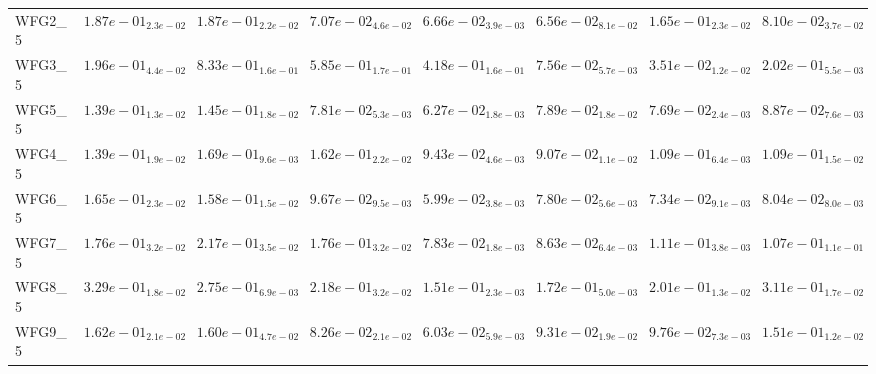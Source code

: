 \documentclass{article}
\begin{document}
\begin{table}
\begin{scriptsize}
\begin{tabular}{llllllll}
WFG2\_5 & $  1.87e-01_{ 2.3e-02}$ & $  1.87e-01_{ 2.2e-02}$ & $  7.07e-02_{ 4.6e-02}$ & \cellcolor{gray25}$  6.66e-02_{ 3.9e-03}$ & \cellcolor{gray95}$  6.56e-02_{ 8.1e-02}$ & $  1.65e-01_{ 2.3e-02}$ & $  8.10e-02_{ 3.7e-02}$ \\
WFG3\_5 & $  1.96e-01_{ 4.4e-02}$ & $  8.33e-01_{ 1.6e-01}$ & $  5.85e-01_{ 1.7e-01}$ & $  4.18e-01_{ 1.6e-01}$ & \cellcolor{gray25}$  7.56e-02_{ 5.7e-03}$ & \cellcolor{gray95}$  3.51e-02_{ 1.2e-02}$ & $  2.02e-01_{ 5.5e-03}$ \\
WFG5\_5 & $  1.39e-01_{ 1.3e-02}$ & $  1.45e-01_{ 1.8e-02}$ & $  7.81e-02_{ 5.3e-03}$ & \cellcolor{gray95}$  6.27e-02_{ 1.8e-03}$ & $  7.89e-02_{ 1.8e-02}$ & \cellcolor{gray25}$  7.69e-02_{ 2.4e-03}$ & $  8.87e-02_{ 7.6e-03}$ \\
WFG4\_5 & $  1.39e-01_{ 1.9e-02}$ & $  1.69e-01_{ 9.6e-03}$ & $  1.62e-01_{ 2.2e-02}$ & \cellcolor{gray25}$  9.43e-02_{ 4.6e-03}$ & \cellcolor{gray95}$  9.07e-02_{ 1.1e-02}$ & $  1.09e-01_{ 6.4e-03}$ & $  1.09e-01_{ 1.5e-02}$ \\
WFG6\_5 & $  1.65e-01_{ 2.3e-02}$ & $  1.58e-01_{ 1.5e-02}$ & $  9.67e-02_{ 9.5e-03}$ & \cellcolor{gray95}$  5.99e-02_{ 3.8e-03}$ & $  7.80e-02_{ 5.6e-03}$ & \cellcolor{gray25}$  7.34e-02_{ 9.1e-03}$ & $  8.04e-02_{ 8.0e-03}$ \\
WFG7\_5 & $  1.76e-01_{ 3.2e-02}$ & $  2.17e-01_{ 3.5e-02}$ & $  1.76e-01_{ 3.2e-02}$ & \cellcolor{gray95}$  7.83e-02_{ 1.8e-03}$ & \cellcolor{gray25}$  8.63e-02_{ 6.4e-03}$ & $  1.11e-01_{ 3.8e-03}$ & $  1.07e-01_{ 1.1e-01}$ \\
WFG8\_5 & $  3.29e-01_{ 1.8e-02}$ & $  2.75e-01_{ 6.9e-03}$ & $  2.18e-01_{ 3.2e-02}$ & \cellcolor{gray95}$  1.51e-01_{ 2.3e-03}$ & \cellcolor{gray25}$  1.72e-01_{ 5.0e-03}$ & $  2.01e-01_{ 1.3e-02}$ & $  3.11e-01_{ 1.7e-02}$ \\
WFG9\_5 & $  1.62e-01_{ 2.1e-02}$ & $  1.60e-01_{ 4.7e-02}$ & \cellcolor{gray25}$  8.26e-02_{ 2.1e-02}$ & \cellcolor{gray95}$  6.03e-02_{ 5.9e-03}$ & $  9.31e-02_{ 1.9e-02}$ & $  9.76e-02_{ 7.3e-03}$ & $  1.51e-01_{ 1.2e-02}$ \\
\hline
\end{tabular}
\end{scriptsize}
\end{table}
\end{document}
